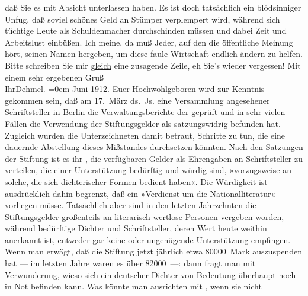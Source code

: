 \begin{ledgroupsized}[t]{13cm}
               daß Sie es mit Absicht unterlassen haben. Es ist doch tatsächlich ein blödsinniger
               Unfug, daß soviel schönes Geld an Stümper verplempert wird, während sich tüchtige
               Leute als Schuldenmacher durchschinden müssen und dabei Zeit und Arbeitslust
               einbüßen. Ich meine, da muß Jeder, auf den die öffentliche Meinung hört, seinen Namen
               hergeben, um diese faule Wirtschaft endlich ändern zu helfen. Bitte schreiben Sie mir
                  \uline{gleich} eine zusagende Zeile, eh Sie’s wieder
               vergessen! \pend
           \pstart
           Mit einem sehr ergebenen Gruß{\\[\baselineskip]}Ihr\spacefill\mbox{Dehmel.}\pend
           \leftskip=0em{}{\bigskip}\pstart
           \raggedleft{}{\pb}Juni 1912.\pend
           \pstart{}Euer Hochwohlgeboren\pend\pstart
           wird zur Kenntnis gekommen sein, daß am 17. März ds. Js. eine
               Versammlung angesehener Schriftsteller in Berlin
               die Verwaltungsberichte der  geprüft und in sehr vielen Fällen die Verwendung der Stiftungsgelder als
               satzungswidrig befunden hat. Zugleich wurden die Unterzeichneten damit betraut,
               Schritte zu tun, die eine dauernde Abstellung dieses Mißstandes durchsetzen
               könnten.\pend
           \pstart
           Nach den Satzungen der Stiftung ist es ihr , die
               verfügbaren Gelder als Ehrengaben an Schriftsteller zu verteilen, die einer
               Unterstützung bedürftig und würdig sind, »vorzugsweise an solche, die sich
               dichterischer Formen bedient haben«. Die Würdigkeit ist ausdrücklich dahin begrenzt,
               daß ein »Verdienst um die Nationalliteratur« vorliegen müsse. Tatsächlich aber sind
               in den letzten Jahrzehnten die Stiftungsgelder großenteils an literarisch wertlose
               Personen vergeben worden, während bedürftige Dichter und Schriftsteller, deren Wert
               heute weithin anerkannt ist, entweder gar keine oder ungenügende Unterstützung
               empfingen.\pend
           \pstart
           Wenn man erwägt, daß die Stiftung jetzt jährlich etwa 80000 Mark auszuspenden hat —
               im letzten Jahre waren es über 82000 —: dann fragt man mit Verwunderung, wieso sich
               ein deutscher Dichter von Bedeutung überhaupt noch in Not befinden kann. Was könnte
               man ausrichten mit , wenn sie nicht

\end{ledgroupsized}
